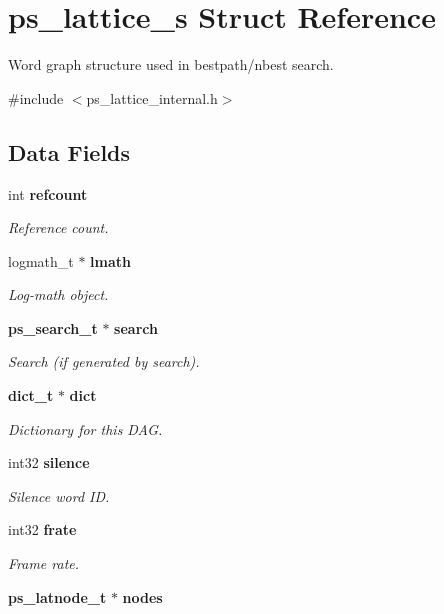 \section{ps\+\_\+lattice\+\_\+s Struct Reference}
\label{structps__lattice__s}


Word graph structure used in bestpath/nbest search.  




{\ttfamily \#include $<$ps\+\_\+lattice\+\_\+internal.\+h$>$}

\subsection*{Data Fields}
\begin{DoxyCompactItemize}
\item 
int \textbf{ refcount}
\begin{DoxyCompactList}\small\item\em Reference count. \end{DoxyCompactList}\item 
logmath\+\_\+t $\ast$ \textbf{ lmath}
\begin{DoxyCompactList}\small\item\em Log-\/math object. \end{DoxyCompactList}\item 
\textbf{ ps\+\_\+search\+\_\+t} $\ast$ \textbf{ search}
\begin{DoxyCompactList}\small\item\em Search (if generated by search). \end{DoxyCompactList}\item 
\textbf{ dict\+\_\+t} $\ast$ \textbf{ dict}
\begin{DoxyCompactList}\small\item\em Dictionary for this D\+AG. \end{DoxyCompactList}\item 
int32 \textbf{ silence}
\begin{DoxyCompactList}\small\item\em Silence word ID. \end{DoxyCompactList}\item 
int32 \textbf{ frate}
\begin{DoxyCompactList}\small\item\em Frame rate. \end{DoxyCompactList}\item 
\textbf{ ps\+\_\+latnode\+\_\+t} $\ast$ \textbf{ nodes}

\end{DoxyCompactItemize}
